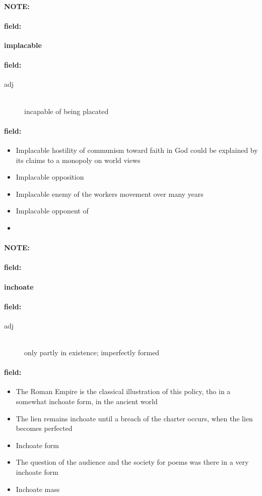 \documentclass[12pt]{article}
\newenvironment{note}{\paragraph{NOTE:}}{}
\newenvironment{field}{\paragraph{field:}}{}
\begin{document}
\begin{note}
\begin{field}
\textbf{\large implacable}
\end{field}


\begin{field}
\begin{description}
\item[adj] \hfill \\ 
incapable of being placated

\end{description}
\end{field}

\begin{field}
\begin{itemize}
\item Implacable hostility of communism toward faith in God could be explained by its claims to a monopoly on world views
\item Implacable opposition
\item Implacable enemy of the workers movement over many years
\item Implacable opponent of
\item 
\end{itemize}
\end{field}
\end{note}
\begin{note}
\begin{field}
\textbf{\large inchoate}
\end{field}


\begin{field}
\begin{description}
\item[adj] \hfill \\ 
only partly in existence; imperfectly formed

\end{description}
\end{field}

\begin{field}
\begin{itemize}
\item The Roman Empire is the classical illustration of this policy, tho in a somewhat inchoate form, in the ancient world
\item The lien remains inchoate until a breach of the charter occurs, when the lien becomes perfected
\item Inchoate form
\item The question of the audience and the society for poems was there in a very inchoate form
\item Inchoate mass
\end{itemize}
\end{field}
\end{note}
\end{document}
